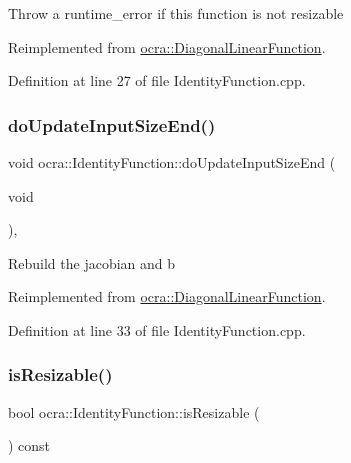 Throw a runtime\+\_\+error if this function is not resizable 

Reimplemented from \hyperlink{classocra_1_1DiagonalLinearFunction_a2071e4c52785c88119917460b94773cb}{ocra\+::\+Diagonal\+Linear\+Function}.



Definition at line 27 of file Identity\+Function.\+cpp.

\hypertarget{classocra_1_1IdentityFunction_adcfa8a32491113a590e7066f0062fbc6}{}\label{classocra_1_1IdentityFunction_adcfa8a32491113a590e7066f0062fbc6} 
\subsubsection{\texorpdfstring{do\+Update\+Input\+Size\+End()}{doUpdateInputSizeEnd()}}
{\footnotesize\ttfamily void ocra\+::\+Identity\+Function\+::do\+Update\+Input\+Size\+End (\begin{DoxyParamCaption}\item[{void}]{ }\end{DoxyParamCaption})\hspace{0.3cm}{\ttfamily [protected]}, {\ttfamily [virtual]}}

Rebuild the jacobian and b 

Reimplemented from \hyperlink{classocra_1_1DiagonalLinearFunction_a8a51d23c302c9bad9579b95e29481f55}{ocra\+::\+Diagonal\+Linear\+Function}.



Definition at line 33 of file Identity\+Function.\+cpp.

\hypertarget{classocra_1_1IdentityFunction_aa468e3e90c544e901ed2d81f6d0eb9f3}{}\label{classocra_1_1IdentityFunction_aa468e3e90c544e901ed2d81f6d0eb9f3} 
\subsubsection{\texorpdfstring{is\+Resizable()}{isResizable()}}
{\footnotesize\ttfamily bool ocra\+::\+Identity\+Function\+::is\+Resizable (\begin{DoxyParamCaption}{ }\end{DoxyParamCaption}) const}

